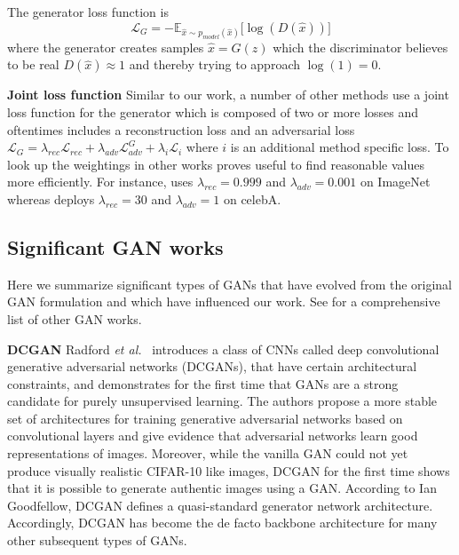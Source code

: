 \documentclass[a4paper,12pt]{report}
\begin{document}
The generator loss function is
\begin{equation} \label{eq:g_loss}
    \mathcal{L}_{G} = -\mathbb{E}_{\hat{x}\sim p_{model} (\hat{x})}\big[\log(D(\hat{x}))\big]
\end{equation}
where the generator creates samples $\hat{x} = G(z)$ which the discriminator believes to be real $D(\hat{x}) \approx 1$ and thereby trying to approach $\log(1) = 0$.

\par \textbf{Joint loss function}
Similar to our work, a number of other methods \cite{1511.05440,DisentFacOfVarByMixTh,1604.07379} use a joint loss function for the generator which is composed of two or more losses and oftentimes includes a reconstruction loss and an adversarial loss $\mathcal{L}_G = \lambda_{rec}\mathcal{L}_{rec} + \lambda_{adv}\mathcal{L}^G_{adv} + \lambda_{i}\mathcal{L}_{i}$ where $i$ is an additional method specific loss. To look up the weightings in other works proves useful to find reasonable values more efficiently. For instance, \cite{1604.07379} uses $\lambda_{rec} = 0.999$ and $\lambda_{adv} = 0.001$ on ImageNet whereas \cite{DisentFacOfVarByMixTh} deploys $\lambda_{rec} = 30$ and $\lambda_{adv} = 1$ on celebA.

\subsection{Significant GAN works}
Here we summarize significant types of GANs that have evolved from the original GAN formulation and which have influenced our work. See \cite{theGanZoo} for a comprehensive list of other GAN works.

\par \textbf{DCGAN} Radford \textit{et al.}~\cite{DCGAN} introduces a class of CNNs called deep convolutional generative adversarial networks (DCGANs), that have certain architectural constraints, and demonstrates for the first time that GANs are a strong candidate for purely unsupervised learning. The authors propose a more stable set of architectures for training generative adversarial networks based on convolutional layers and give evidence that adversarial networks learn good representations of images. Moreover, while the vanilla GAN could not yet produce visually realistic CIFAR-10 like images, DCGAN for the first time shows that it is possible to generate authentic images using a GAN. According to Ian Goodfellow, DCGAN defines a quasi-standard generator network architecture. Accordingly, DCGAN has become the de facto backbone architecture for many other subsequent types of GANs.
\end{document}
